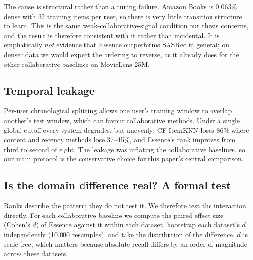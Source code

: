 \documentclass[runningheads]{llncs}
\begin{document}
The cause is structural rather than a tuning failure. Amazon Books is 0.063\% dense with 32
training items per user, so there is very little transition structure to learn. This is the
same weak-collaborative-signal condition our thesis concerns, and the result is therefore
consistent with it rather than incidental. It is emphatically \emph{not} evidence that
Essence outperforms SASRec in general; on denser data we would expect the ordering to
reverse, as it already does for the other collaborative baselines on MovieLens-25M.

\subsection{Temporal leakage}\label{sec:leak}

Per-user chronological splitting allows one user's training window to overlap another's
test window, which can favour collaborative methods. Under a single global cutoff every
system degrades, but unevenly: CF-ItemKNN loses 86\% where content and recency methods lose
37--45\%, and Essence's rank improves from third to second of eight. The leakage was
inflating the collaborative baselines, so our main protocol is the conservative choice for
this paper's central comparison.

\subsection{Is the domain difference real? A formal test}\label{sec:interaction}

Ranks describe the pattern; they do not test it. We therefore test the interaction directly.
For each collaborative baseline we compute the paired effect size (Cohen's $d$) of Essence
against it within each dataset, bootstrap each dataset's $d$ independently (10{,}000
resamples), and take the distribution of the difference. $d$ is scale-free, which matters
because absolute recall differs by an order of magnitude across these datasets.
\end{document}
